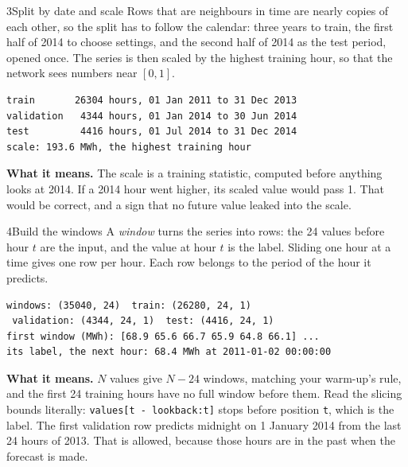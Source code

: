 \begin{labquestion}{3}{Split by date and scale}
Rows that are neighbours in time are nearly copies of each other, so the split has to follow the calendar: three years to train, the first half of 2014 to choose settings, and the second half of 2014 as the test period, opened once. The series is then scaled by the highest training hour, so that the network sees numbers near $[0,1]$.
\end{labquestion}
\begin{labanswer}

\begin{refoutput}
\begin{lstlisting}[style=utpterminal]
train       26304 hours, 01 Jan 2011 to 31 Dec 2013
validation   4344 hours, 01 Jan 2014 to 30 Jun 2014
test         4416 hours, 01 Jul 2014 to 31 Dec 2014
scale: 193.6 MWh, the highest training hour
\end{lstlisting}
\end{refoutput}

\textbf{What it means.} The scale is a training statistic, computed before anything looks at 2014. If a 2014 hour went higher, its scaled value would pass 1. That would be correct, and a sign that no future value leaked into the scale.
\end{labanswer}

\begin{labquestion}{4}{Build the windows}
A \emph{window} turns the series into rows: the 24 values before hour $t$ are the input, and the value at hour $t$ is the label. Sliding one hour at a time gives one row per hour. Each row belongs to the period of the hour it predicts.
\end{labquestion}
\begin{labanswer}


\begin{refoutput}
\begin{lstlisting}[style=utpterminal]
windows: (35040, 24)  train: (26280, 24, 1)
 validation: (4344, 24, 1)  test: (4416, 24, 1)
first window (MWh): [68.9 65.6 66.7 65.9 64.8 66.1] ...
its label, the next hour: 68.4 MWh at 2011-01-02 00:00:00
\end{lstlisting}
\end{refoutput}

\textbf{What it means.} $N$ values give $N-24$ windows, matching your warm-up's rule, and the first 24 training hours have no full window before them. Read the slicing bounds literally: \texttt{values[t - lookback:t]} stops before position \texttt{t}, which is the label. The first validation row predicts midnight on 1 January 2014 from the last 24 hours of 2013. That is allowed, because those hours are in the past when the forecast is made.
\end{labanswer}

